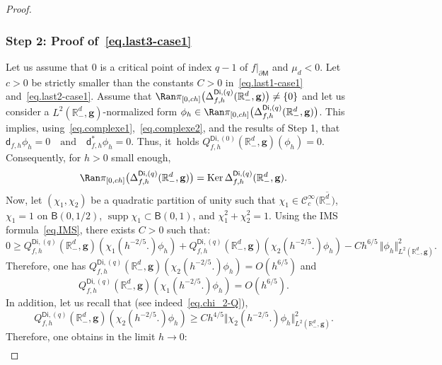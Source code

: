 \documentclass[JEP,XML,SOM,Unicode,NoEqCountersInSection,NoFloatCountersInSection,published]{cedram}
\newcommand{\quand}{\quad\text{and}\quad}
\newcommand{\mbf}[1]{\mathbf{#1}}
\let\pa\partial
\DeclareMathOperator\Ker{Ker}
\DeclareMathOperator\supp{supp}
\theoremstyle{plain}
\theoremstyle{definition}
\begin{document}
\begin{proof}
\subsubsection*{Step 2: Proof of~\eqref{eq.last3-case1}}
Let us assume that $0$ is a critical point of index $q-1$ of
$f|_{\pa \mathsf M}$ and $\mu_{d}<0$. Let $c>0$ be strictly
smaller than the constants $C>0$ in~\eqref{eq.last1-case1}
and~\eqref{eq.last2-case1}. Assume that $\Ran \pi_{[0,ch]}\bigl(\Delta_{f,h}^{\mathsf{Di},(q)}(\mathbb R_-^d, \mbf g) \bigr)\neq
\{0\}$ and let us consider a $L^2(\mathbb R_-^d, \mbf g) $-normalized form $\phi_h\in \Ran \pi_{[0,ch]}\bigl(\Delta_{f,h}^{\mathsf{Di},(q)}(\mathbb R_-^d, \mbf g) \bigr)$. This implies, using~\eqref{eq.complexe1},~\eqref{eq.complexe2}, and the results of {Step 1}, that
$\mathsf d_{f,h}\phi_h= 0 \quand \mathsf d_{f,h}^*\phi_h=0$.
Thus, it~holds $ Q_{f,h}^{\mathsf{Di},(0)}(\mathbb R^d_-,\mbf g)(\phi_h)=0$.
Consequently, for $h>0$ small enough,
\[
\Ran \pi_{[0,ch]}\bigl(\Delta_{f,h}^{\mathsf{Di},(q)}(\mathbb R^d_-,\mbf g)\bigr)=\Ker \Delta_{f,h}^{\mathsf{Di},(q)}(\mathbb R^d_-,\mbf g).
\]
Now, let $(\chi_1,\chi_2)$ be a quadratic partition of unity such that $\chi_1\in \mathcal C_c^\infty (\overline {\mathbb R_-^d)}$, $\chi_1=1$ on $\mathsf B(0,1/2)$, $\supp \chi_1\subset \mathsf B(0,1)$, and $\chi_1^2+\chi_2^2=1$.
Using the IMS formula~\eqref{eq.IMS}, there exists $C>0$ such that:\vspace*{-3pt}
\[
0 \!\ge\! Q_{f,h}^{\mathsf{Di},(q)}(\mathbb R^d_-,\mbf g)
(\chi_1(h^{-2/5 }.) \phi_h)+Q_{f,h}^{\mathsf{Di},(q)}(\mathbb R^d_-,\mbf g)(\chi_2(h^{-2/5 }.) \phi_h)
-C h^{6/5}\, \big \Vert
\phi_h\big \Vert_{L^2(\mathbb R^d_-,\mbf g)}^2.
\]
Therefore, one has $Q_{f,h}^{\mathsf{Di},(q)}(\mathbb R^d_-,\mbf g)(\chi_2(h^{-2/5 }.) \phi_h) =O(h^{6/5})$ and\vspace*{-3pt}
\begin{equation}\label{quad-chi1-b}
Q_{f,h}^{\mathsf{Di},(q)}(\mathbb R^d_-,\mbf g) (\chi_1(h^{-2/5 }.)\phi_h)= O (h^{6/5}).
\end{equation}
In addition, let us recall that (see indeed~\eqref{eq.chi_2-Q}),\vspace*{-3pt}
\[
Q_{f,h}^{\mathsf{Di},(q)}(\mathbb R^d_-,\mbf g)(\chi_2(h^{-2/5 }.) \phi_h)\ge Ch^{4/5} \big \Vert \chi_2(h^{-2/5 }.) \phi_h\big \Vert_{L^2(\mathbb R^d_-,\mbf g)}^2.
\]
Therefore, one obtains in the limit $h\to 0$:\vspace*{-3pt}
\begin{equation}\label{norme-chi-b}
\begin{aligned}

\end{aligned}
\end{equation}
\end{proof}
\end{document}
